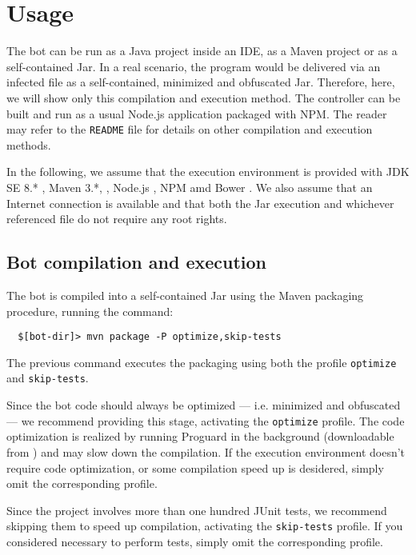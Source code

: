 \section{Usage}
\label{sec:usage}

The bot can be run as a Java project inside an IDE, as a Maven project or as a self-contained Jar.
In a real scenario, the program would be delivered via an infected file as a self-contained, minimized and obfuscated Jar. Therefore, here, we will show only this compilation and execution method.
The controller can be built and run as a usual Node.js application packaged with NPM.
The reader may refer to the \texttt{README} file for details on other compilation and execution methods.

In the following, we assume that the execution environment is provided with JDK SE 8.* \cite{jdk}, Maven 3.*, \cite{maven}, Node.js \cite{nodejs}, NPM \cite{npm} amd Bower \cite{bower}. 
We also assume that an Internet connection is available and that both the Jar execution and whichever referenced file do not require any root rights.

\subsection{Bot compilation and execution}
\label{sec:bot-compilation-execution}

The bot is compiled into a self-contained Jar using the Maven packaging procedure, running the command:

\begin{verbatim}
  $[bot-dir]> mvn package -P optimize,skip-tests
\end{verbatim}

The previous command executes the packaging using both the profile \texttt{optimize} and \texttt{skip-tests}.

Since the bot code should always be optimized — i.e. minimized and obfuscated — we recommend providing this stage, activating the \texttt{optimize} profile. The code optimization is realized by running Proguard in the background (downloadable from \cite{proguard}) and may slow down the compilation. If the execution environment doesn't require code optimization, or some compilation speed up is desidered, simply omit the corresponding profile.

Since the project involves more than one hundred JUnit tests, we recommend skipping them to speed up compilation, activating the \texttt{skip-tests} profile. If you considered necessary to perform tests, simply omit the corresponding profile.

